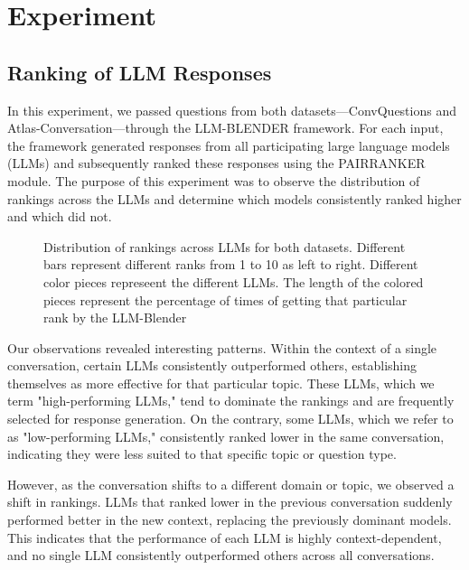 \documentclass[sigconf,authordraft]{acmart}
\begin{document}
\section{Experiment}
\subsection{Ranking of LLM Responses}

In this experiment, we passed questions from both datasets—ConvQuestions and Atlas-Conversation—through the LLM-BLENDER framework. For each input, the framework generated responses from all participating large language models (LLMs) and subsequently ranked these responses using the PAIRRANKER module. The purpose of this experiment was to observe the distribution of rankings across the LLMs and determine which models consistently ranked higher and which did not.

\begin{figure}[htbp]
    \centering
    \hspace{0.05\linewidth} %
    \caption{Distribution of rankings across LLMs for both datasets. Different bars represent different ranks from 1 to 10 as left to right. Different color pieces represeent the different LLMs. The length of the colored pieces represent the percentage of times of getting that particular rank by the LLM-Blender}
    \label{fig:ranking-distribution}
\end{figure}





Our observations revealed interesting patterns. Within the context of a single conversation, certain LLMs consistently outperformed others, establishing themselves as more effective for that particular topic. These LLMs, which we term "high-performing LLMs," tend to dominate the rankings and are frequently selected for response generation. On the contrary, some LLMs, which we refer to as "low-performing LLMs," consistently ranked lower in the same conversation, indicating they were less suited to that specific topic or question type.

However, as the conversation shifts to a different domain or topic, we observed a shift in rankings. LLMs that ranked lower in the previous conversation suddenly performed better in the new context, replacing the previously dominant models. This indicates that the performance of each LLM is highly context-dependent, and no single LLM consistently outperformed others across all conversations.
\end{document}
